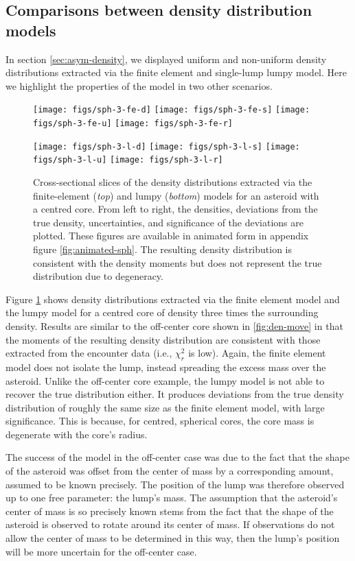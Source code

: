 \documentclass[fleqn,usenatbib]{mnras}
\begin{document}
\subsection{Comparisons between density distribution models}
\label{sec:density-compare}

In section \ref{sec:asym-density}, we displayed uniform and non-uniform density distributions extracted via the finite element and single-lump lumpy model. Here we highlight the properties of the model in two other scenarios.

\begin{figure}
  \texttt{[image: figs/sph-3-fe-d]}\hfill
  \texttt{[image: figs/sph-3-fe-s]}\hfill
  \texttt{[image: figs/sph-3-fe-u]}\hfill
  \texttt{[image: figs/sph-3-fe-r]}

  \texttt{[image: figs/sph-3-l-d]}\hfill
  \texttt{[image: figs/sph-3-l-s]}\hfill
  \texttt{[image: figs/sph-3-l-u]}\hfill
  \texttt{[image: figs/sph-3-l-r]}

  \caption{Cross-sectional slices of the density distributions extracted via the finite-element (\textit{top}) and lumpy (\textit{bottom}) models for an asteroid with a centred core. From left to right, the densities, deviations from the true density, uncertainties, and significance of the deviations are plotted. These figures are available in animated form in appendix figure \ref{fig:animated-sph}. The resulting density distribution is consistent with the density moments but does not represent the true distribution due to degeneracy.}
  \label{fig:den-sph}
\end{figure}

Figure \ref{fig:den-sph} shows density distributions extracted via the finite element model and the lumpy model for a centred core of density three times the surrounding density. Results are similar to the off-center core shown in \ref{fig:den-move} in that the moments of the resulting density distribution are consistent with those extracted from the encounter data (i.e., $\chi^2_r$ is low). Again, the finite element model does not isolate the lump, instead spreading the excess mass over the asteroid. Unlike the off-center core example, the lumpy model is not able to recover the true distribution either. It produces deviations from the true density distribution of roughly the same size as the finite element model, with large significance. This is because, for centred, spherical cores, the core mass is degenerate with the core's radius.

The success of the model in the off-center case was due to the fact that the shape of the asteroid was offset from the center of mass by a corresponding amount, assumed to be known precisely. The position of the lump was therefore observed up to one free parameter: the lump's mass. The assumption that the asteroid's center of mass is so precisely known stems from the fact that the shape of the asteroid is observed to rotate around its center of mass. If observations do not allow the center of mass to be determined in this way, then the lump's position will be more uncertain for the off-center case.
\end{document}
